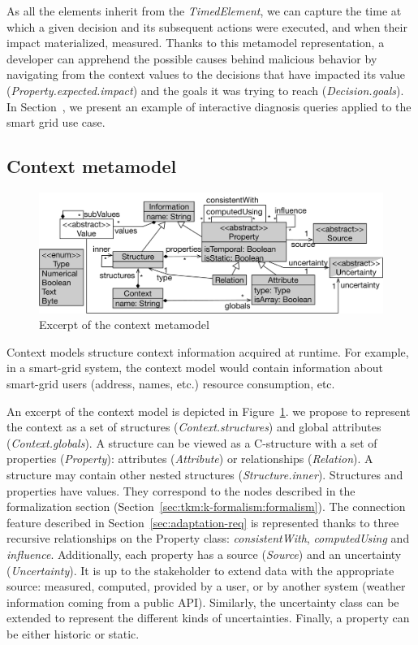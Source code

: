 As all the elements inherit from the \textit{TimedElement}, we can capture the time at which a given decision and its subsequent actions were executed, and when their impact materialized, \ie measured.
Thanks to this metamodel representation, a developer can apprehend the possible causes behind malicious behavior by navigating from the context values to the decisions that have impacted its value (\textit{Property.expected.impact}) and the goals it was trying to reach (\textit{Decision.goals}).
In Section~, we present an example of interactive diagnosis queries applied to the smart grid use case.

\subsection{Context metamodel}
\begin{figure}
  \begin{center}
      \includegraphics[width=.8\linewidth]{img/chapt-tkm/mm/contextModel}
      \caption{Excerpt of the context metamodel}
      \label{fig:context-model}
  \end{center}	
\end{figure}

Context models structure context information acquired at runtime. 
For example, in a smart-grid system, the context model would contain information about smart-grid users (address, names, etc.) resource consumption, etc.

An excerpt of the context model is depicted in Figure~\ref{fig:context-model}. 
we propose to represent the context as a set of structures (\textit{Context.structures}) and global attributes (\textit{Context.globals}).
A structure can be viewed as a C-structure with a set of properties (\textit{Property}): attributes (\textit{Attribute}) or relationships (\textit{Relation}).
A structure may contain other nested structures (\textit{Structure.inner}).
Structures and properties have values.
They correspond to the nodes described in the formalization section (\cf Section~\ref{sec:tkm:k-formalism:formalism}).
The connection feature described in Section~\ref{sec:adaptation-req} is represented thanks to three recursive relationships on the Property class: \textit{consistentWith}, \textit{computedUsing} and \textit{influence}.
Additionally, each property has a source (\textit{Source}) and an uncertainty (\textit{Uncertainty}).
It is up to the stakeholder to extend data with the appropriate source: measured, computed, provided by a user, or by another system (\eg weather information coming from a public API).
Similarly, the uncertainty class can be extended to represent the different kinds of uncertainties. Finally, a property can be either historic or static.

